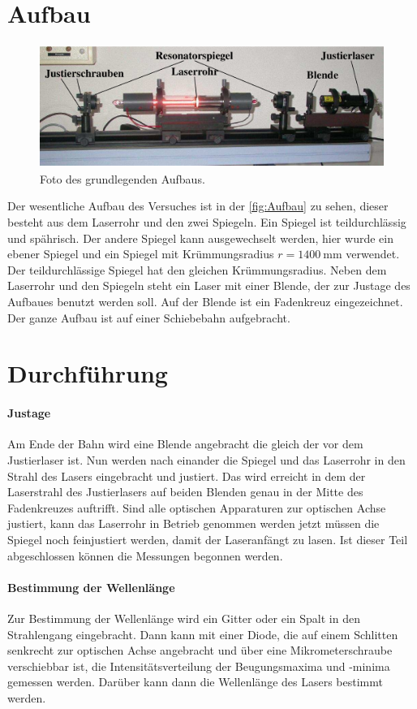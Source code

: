 \section{Aufbau}
\begin{figure}
  \centering
  \includegraphics[height = 4cm]{pics/Aufbau.png}
  \caption{Foto des grundlegenden Aufbaus.}
  \label{fig:Aufbau}
\end{figure}
Der wesentliche Aufbau des Versuches ist in der \autoref{fig:Aufbau} zu sehen, dieser besteht aus dem 
Laserrohr und den zwei Spiegeln. Ein Spiegel ist teildurchlässig und spährisch. Der andere Spiegel kann 
ausgewechselt werden, hier wurde ein ebener Spiegel und ein Spiegel mit Krümmungsradius 
$r = \SI{1400}{\milli\meter}$ verwendet. Der teildurchlässige Spiegel hat den gleichen Krümmungsradius. 
Neben dem Laserrohr und den Spiegeln steht ein Laser mit einer Blende, der zur Justage des 
Aufbaues benutzt werden soll. Auf der Blende ist ein Fadenkreuz eingezeichnet. Der ganze Aufbau 
ist auf einer Schiebebahn aufgebracht.\\
\section{Durchführung}
\label{sec:Durchführung}
\paragraph{Justage}
Am Ende der Bahn wird eine Blende angebracht die gleich der vor dem Justierlaser ist. Nun werden 
nach einander die Spiegel und das Laserrohr in den Strahl des Lasers eingebracht und justiert. Das wird 
erreicht in dem der Laserstrahl des Justierlasers auf beiden Blenden genau in der Mitte des 
Fadenkreuzes auftrifft. Sind alle optischen Apparaturen zur optischen Achse justiert, kann das 
Laserrohr in Betrieb genommen werden jetzt müssen die Spiegel noch feinjustiert werden, damit der 
Laseranfängt zu lasen. Ist dieser Teil abgeschlossen können die Messungen begonnen werden.
\paragraph{Bestimmung der Wellenlänge}
Zur Bestimmung der Wellenlänge wird ein Gitter oder ein Spalt in den Strahlengang eingebracht. 
Dann kann mit einer Diode, die auf einem Schlitten senkrecht zur optischen Achse angebracht und 
über eine Mikrometerschraube verschiebbar ist, die Intensitätsverteilung der Beugungsmaxima und -minima 
gemessen werden. Darüber kann dann die Wellenlänge des Lasers bestimmt werden.
